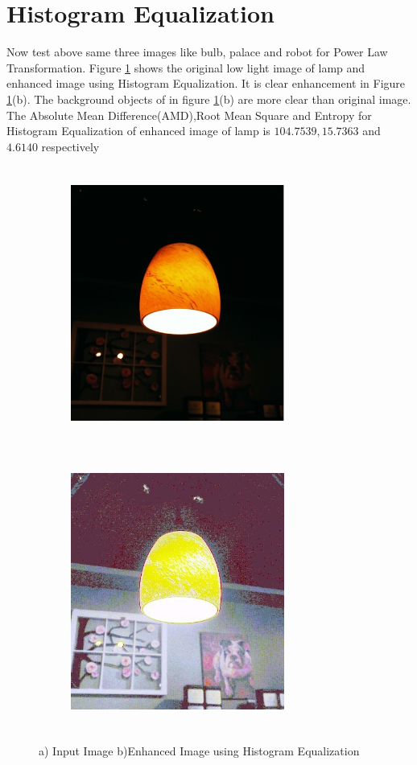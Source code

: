 \section{Histogram Equalization}
Now test above same three images like bulb, palace and robot for Power Law Transformation. Figure \ref{fig:histEqu} shows the original low light image of lamp and enhanced image using Histogram Equalization. It is clear enhancement in Figure \ref{fig:histEqu}(b). The background objects of in figure \ref{fig:histEqu}(b) are more clear than original image. The Absolute Mean Difference(AMD),Root Mean Square and Entropy for Histogram Equalization of enhanced image of lamp is $104.7539,15.7363$ and $4.6140$ respectively      


\begin{figure}[!htb]
	\begin{subfigure}{8cm}
		\centering    
    	\includegraphics[width=7cm,height=9cm,keepaspectratio]{images/ch5/bulb_input.jpg}
    	\caption{} 
    \end{subfigure}
  	\begin{subfigure}{6cm}
  		\centering
  		\includegraphics[width=7cm,height=9cm,keepaspectratio]{images/ch5/bulb_hist_equ.jpg}
   		\caption{}
  	\end{subfigure}
  	\caption{a) Input Image b)Enhanced Image using Histogram Equalization}
  	\label{fig:histEqu}
\end{figure}

